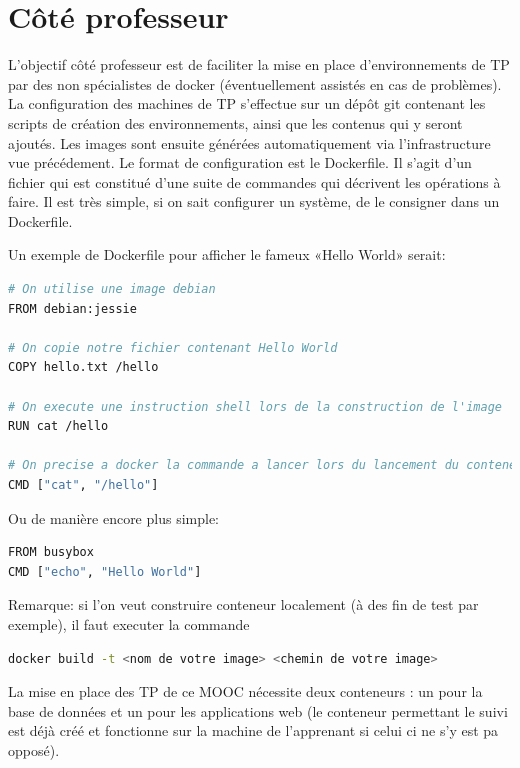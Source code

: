 \documentclass[a4paper,11pt]{report}
\begin{document}
\section{Côté professeur}

L'objectif côté professeur est de faciliter la mise en place d'environnements de TP par des non spécialistes de docker (éventuellement assistés en cas de problèmes).
La configuration des machines de TP s'effectue sur un dépôt git contenant les scripts de création des environnements, ainsi que les contenus qui y seront ajoutés. Les images sont ensuite générées automatiquement via l'infrastructure vue précédement.
Le format de configuration est le Dockerfile. Il s'agit d'un fichier qui est constitué d'une suite de commandes qui décrivent les opérations à faire. Il est très simple, si on sait configurer un système, de le consigner dans un Dockerfile.

Un exemple de Dockerfile pour afficher le fameux «Hello World» serait:

\begin{lstlisting}[language=Bash,caption={Dockerfile Hello World}]
# On utilise une image debian
FROM debian:jessie

# On copie notre fichier contenant Hello World
COPY hello.txt /hello

# On execute une instruction shell lors de la construction de l'image
RUN cat /hello

# On precise a docker la commande a lancer lors du lancement du conteneur
CMD ["cat", "/hello"]
\end{lstlisting}

Ou de manière encore plus simple:

\begin{lstlisting}[language=Bash,caption={Dockerfile Hello World simplifié}]
FROM busybox
CMD ["echo", "Hello World"]
\end{lstlisting}

Remarque: si l'on veut construire conteneur localement (à des fin de test par exemple), il faut executer la commande 
\begin{lstlisting}[language=Bash,caption={Construire une image docker}]
docker build -t <nom de votre image> <chemin de votre image>
\end{lstlisting}

La mise en place des TP de ce MOOC nécessite deux conteneurs : un pour la base de données et un pour les applications web (le conteneur permettant le suivi est déjà créé et fonctionne sur la machine de l'apprenant si celui ci ne s'y est pa opposé).
\end{document}

